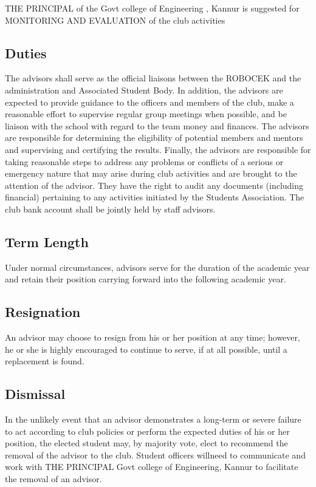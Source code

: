 THE PRINCIPAL of the Govt college of Engineering , Kannur is suggested
for MONITORING AND EVALUATION of the club activities

\subsection{Duties}
The advisors shall serve as the official liaisons between the ROBOCEK
and the administration and Associated Student Body. In addition, the
advisors are expected to provide guidance to the officers and members of
the club, make a reasonable effort to supervise regular group meetings
when possible, and be liaison with the school with regard to the team
money and finances. The advisors are responsible for determining the
eligibility of potential members and mentors and supervising and certifying
the results. Finally, the advisors are responsible for taking reasonable
steps to address any problems or conflicts of a serious or emergency
nature that may arise during club activities and are brought to the attention
of the advisor. They have the right to audit any documents (including
financial) pertaining to any activities initiated by the Students Association.
The club bank account shall be jointly held by staff advisors.

\subsection{Term Length}
Under normal circumstances, advisors serve for the duration of the
academic year and retain their position carrying forward into the following
academic year.

\subsection{Resignation}
An advisor may choose to resign from his or her position at any time;
however, he or she is highly encouraged to continue to serve, if at all
possible, until a replacement is found.

\subsection{Dismissal}
In the unlikely event that an advisor demonstrates a long-term or severe
failure to act according to club policies or perform the expected duties of
his or her position, the elected student may, by majority vote, elect to
recommend the removal of the advisor to the club. Student officers willneed to communicate and work with THE PRINCIPAL Govt college of
Engineering, Kannur to facilitate the removal of an advisor.

